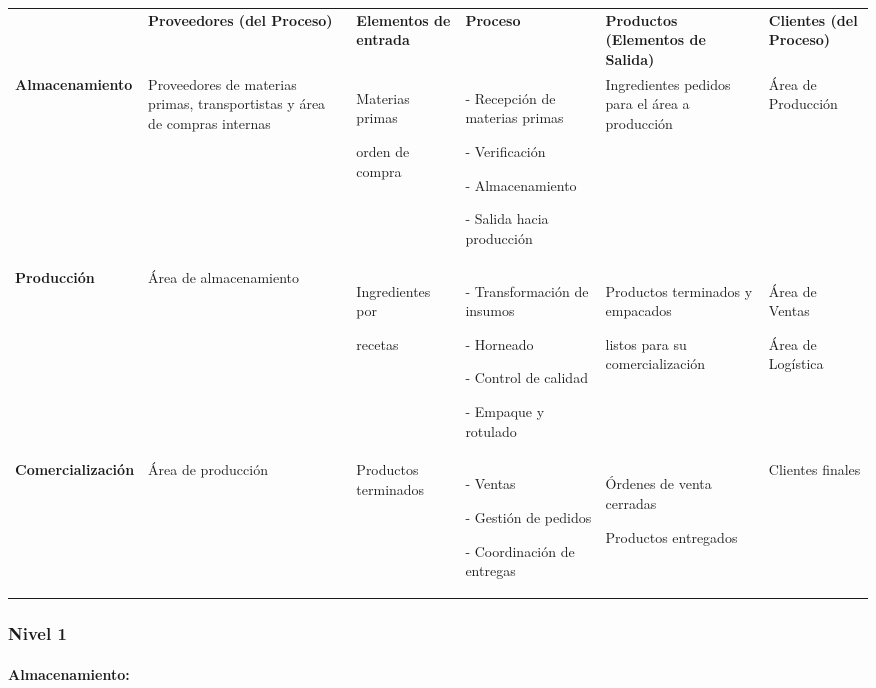 \documentclass[11pt]{article}
\newcounter{none} %
\begin{document}
{\def\LTcaptype{none} %
\begin{longtable}[]{@{}
  >{\centering\arraybackslash}p{}
  >{\centering\arraybackslash}p{}
  >{\centering\arraybackslash}p{}
  >{\centering\arraybackslash}p{}
  >{\centering\arraybackslash}p{}
  >{\centering\arraybackslash}p{}@{}}
\toprule\noalign{}
\endhead
\bottomrule\noalign{}
\endlastfoot
& \textbf{Proveedores (del Proceso)} & \textbf{Elementos de entrada} &
\textbf{Proceso} & \textbf{Productos (Elementos de Salida)} &
\textbf{Clientes (del Proceso)} \\
\textbf{Almacenamiento} & Proveedores de materias primas, transportistas
y área de compras internas & Materias primas

orden de compra & - Recepción de materias primas

- Verificación

- Almacenamiento

- Salida hacia producción & Ingredientes pedidos para el área a
producción & Área de Producción \\
\textbf{Producción} & Área de almacenamiento & Ingredientes por

recetas & - Transformación de insumos

- Horneado

- Control de calidad

- Empaque y rotulado & Productos terminados y empacados

listos para su comercialización & Área de Ventas

Área de Logística \\
\textbf{Comercialización} & Área de producción & Productos terminados &
- Ventas

- Gestión de pedidos

- Coordinación de entregas & Órdenes de venta cerradas

Productos entregados & Clientes finales \\
\end{longtable}
}

\subsubsection{Nivel 1}

\paragraph{Almacenamiento:}
\end{document}
